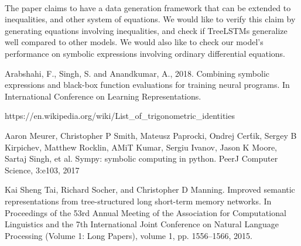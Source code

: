 \documentclass{article}
\begin{document}
\begin{normalsize}
\paragraph{}
The paper claims to have a data generation framework that can be extended to inequalities, and other system of equations. We would like to verify this claim by generating equations involving inequalities, and check if TreeLSTMs generalize well compared to other models. We would also like to
check our model's performance on symbolic expressions involving ordinary differential equations.
        
\begin{thebibliography}{}
 Arabshahi, F., Singh, S. and Anandkumar, A., 2018. Combining symbolic expressions and black-box function evaluations for training neural programs. In International Conference on Learning Representations.

 https://en.wikipedia.org/wiki/List\_of\_trigonometric\_identities

 Aaron Meurer, Christopher P Smith, Mateusz Paprocki, Ondrej Cert́ik, Sergey B Kirpichev, Matthew
Rocklin, AMiT Kumar, Sergiu Ivanov, Jason K Moore, Sartaj Singh, et al. Sympy: symbolic computing in python. PeerJ Computer Science, 3:e103, 2017

 Kai Sheng Tai, Richard Socher, and Christopher D Manning. Improved semantic representations from
tree-structured long short-term memory networks. In Proceedings of the 53rd Annual Meeting
of the Association for Computational Linguistics and the 7th International Joint Conference on
Natural Language Processing (Volume 1: Long Papers), volume 1, pp. 1556–1566, 2015.

\end{thebibliography}
\end{normalsize}
  
\end{document}
